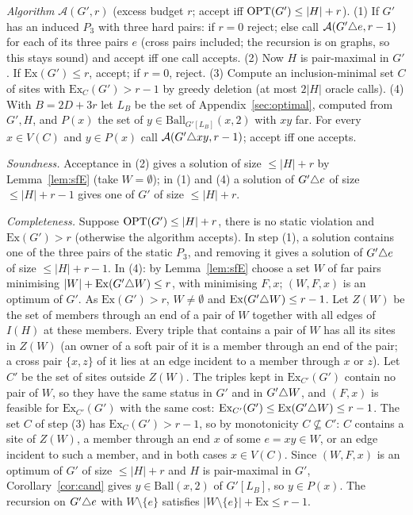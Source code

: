 \emph{Algorithm} $\mathcal A(G',r)$ (excess budget $r$; accept iff $\mathrm{OPT}(G')\le|H|+r$).
(1) If $G'$ has an induced $P_3$ with three hard pairs: if $r=0$ reject; else call $\mathcal A(G'\triangle e,r-1)$ for each of its three pairs $e$ (cross pairs included; the recursion is on graphs, so this stays sound) and accept iff one call accepts.
(2) Now $H$ is pair-maximal in $G'$. If $\mathrm{Ex}(G')\le r$, accept; if $r=0$, reject.
(3) Compute an inclusion-minimal set $C$ of sites with $\mathrm{Ex}_C(G')>r-1$ by greedy deletion (at most $2|H|$ oracle calls).
(4) With $B=2D+3r$ let $L_B$ be the set of Appendix~\ref{sec:optimal}, computed from $G',H$, and $P(x)$ the set of $y\in\mathrm{Ball}_{G'[L_B]}(x,2)$ with $xy$ far. For every $x\in V(C)$ and $y\in P(x)$ call $\mathcal A(G'\triangle xy,r-1)$; accept iff one accepts.

\emph{Soundness.} Acceptance in (2) gives a solution of size $\le|H|+r$ by Lemma~\ref{lem:sfE} (take $W=\emptyset$); in (1) and (4) a solution of $G'\triangle e$ of size $\le|H|+r-1$ gives one of $G'$ of size $\le|H|+r$.

\emph{Completeness.} Suppose $\mathrm{OPT}(G')\le|H|+r$, there is no static violation and $\mathrm{Ex}(G')>r$ (otherwise the algorithm accepts). In step (1), a solution contains one of the three pairs of the static $P_3$, and removing it gives a solution of $G'\triangle e$ of size $\le|H|+r-1$. In (4): by Lemma~\ref{lem:sfE} choose a set $W$ of far pairs minimising $|W|+\mathrm{Ex}(G'\triangle W)\le r$, with minimising $F,x$; $(W,F,x)$ is an optimum of $G'$. As $\mathrm{Ex}(G')>r$, $W\ne\emptyset$ and $\mathrm{Ex}(G'\triangle W)\le r-1$. Let $Z(W)$ be the set of members through an end of a pair of $W$ together with all edges of $I(H)$ at these members. Every triple that contains a pair of $W$ has all its sites in $Z(W)$ (an owner of a soft pair of it is a member through an end of the pair; a cross pair $\{x,z\}$ of it lies at an edge incident to a member through $x$ or $z$). Let $C'$ be the set of sites outside $Z(W)$. The triples kept in $\mathrm{Ex}_{C'}(G')$ contain no pair of $W$, so they have the same status in $G'$ and in $G'\triangle W$, and $(F,x)$ is feasible for $\mathrm{Ex}_{C'}(G')$ with the same cost: $\mathrm{Ex}_{C'}(G')\le\mathrm{Ex}(G'\triangle W)\le r-1$. The set $C$ of step (3) has $\mathrm{Ex}_C(G')>r-1$, so by monotonicity $C\not\subseteq C'$: $C$ contains a site of $Z(W)$, a member through an end $x$ of some $e=xy\in W$, or an edge incident to such a member, and in both cases $x\in V(C)$. Since $(W,F,x)$ is an optimum of $G'$ of size $\le|H|+r$ and $H$ is pair-maximal in $G'$, Corollary~\ref{cor:cand} gives $y\in\mathrm{Ball}(x,2)$ of $G'[L_B]$, so $y\in P(x)$. The recursion on $G'\triangle e$ with $W\setminus\{e\}$ satisfies $|W\setminus\{e\}|+\mathrm{Ex}\le r-1$.


